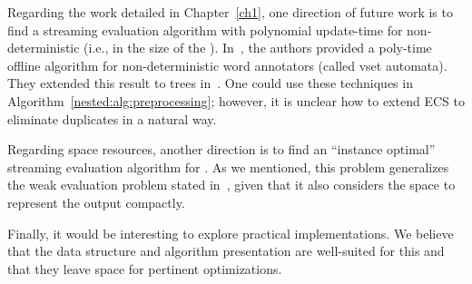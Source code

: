 
Regarding the work detailed in Chapter~\ref{ch1}, one direction of future work is to find a streaming evaluation algorithm with polynomial update-time for non-deterministic \vpann (i.e., in the size of the \vpann). In~\cite{AmarilliBMN19}, the authors provided a poly-time offline algorithm for non-deterministic word annotators (called vset automata). 
They extended this result to trees in~\cite{AmarilliBMN19pods}. One could use these techniques in Algorithm~\ref{nested:alg:preprocessing}; however, it is unclear how to extend ECS to eliminate duplicates in a natural way. 

Regarding space resources, another direction is to find an ``instance optimal'' streaming evaluation algorithm for \vpann. 
As we mentioned, this problem generalizes the weak evaluation problem stated in~\cite{SegoufinV02}, given that it also considers the space to represent the output compactly. 

Finally, it would be interesting to explore practical implementations. 
We believe that the data structure and algorithm presentation are well-suited for this and that they leave space for pertinent optimizations.


